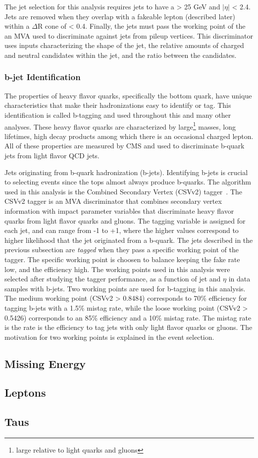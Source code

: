 The jet selection for this analysis requires jets to have a \pt > 25 GeV and $|\eta|$ < 2.4. Jets are removed when they overlap with a fakeable lepton (described later) within
a $\Delta$R cone of < 0.4. Finally, the jets must pass the working point of the an MVA used to discriminate against jets from pileup vertices. This discriminator uses inputs
characterizing the shape of the jet, the relative amounts of charged and neutral candidates within the jet, and the \pt ratio between the candidates. 

\subsubsection{b-jet Identification}
The properties of heavy flavor quarks, specifically the bottom quark, have unique characteristics that make their hadronizations easy to identify or tag. This identification is called
b-tagging and used throughout this and many other analyses. These heavy flavor quarks are characterized by large\footnote{large relative to light quarks and gluons} masses,
long lifetimes, high \pt decay products among which there is an occasional charged lepton. All of these properties are measured by CMS and used to discriminate b-quark jets
from light flavor QCD jets. 

Jets originating from b-quark hadronization (b-jets). Identifying b-jets is crucial to selecting \tth events since the tops
almost always produce b-quarks. The algorithm used in this analysis is the Combined Secondary Vertex (CSVv2) tagger~\cite{csvv2}. The CSVv2 tagger is an MVA discriminator that
combines secondary vertex information with impact parameter variables that discriminate heavy flavor quarks from light flavor quarks and gluons. The tagging variable is assigned
for each jet, and can range from -1 to +1, where the higher values correspond to higher likelihood that the jet originated from a b-quark. The jets described in the previous
subsection are \emph{tagged} when they pass a specific working point of the tagger. The specific working point is choosen to balance keeping the fake rate low, and the efficiency
high. The working points used in this analysis were selected after studying the tagger performance, as a function of jet \pt and $\eta$ in data samples with b-jets. Two working points
are used for b-tagging in this analysis. The medium working point (CSVv2 > 0.8484) corresponds to 70\% efficiency for tagging
b-jets with a 1.5\% mistag rate, while the loose working point (CSVv2 > 0.5426) corresponds to an 85\% efficiency and a 10\% mistag rate. The mistag rate is the rate is the efficiency
to tag jets with only light flavor quarks or gluons. The motivation for two working points is explained in the event selection. 

\subsection{Missing Energy}
\subsection{Leptons}
\subsection{Taus}

